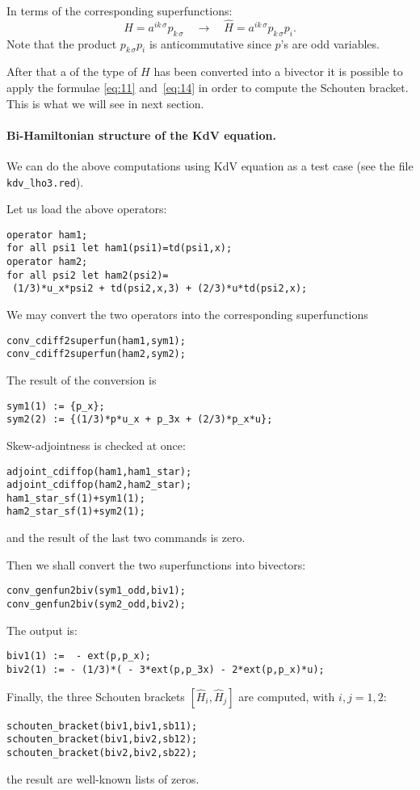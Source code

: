 In terms of the corresponding superfunctions:
\[
  H = a^{ik\,\sigma} p_{k\,\sigma} \quad \to \quad
  \hat H = a^{ik\,\sigma} p_{k\,\sigma}p_i.
\]
Note that the product $p_{k\,\sigma}p_i$ is anticommutative since $p$'s are odd
variables.

After that a \cdiffop of the type of $H$ has been converted into a bivector it
is possible to apply the formulae \eqref{eq:11} and~\eqref{eq:14} in order to
compute the Schouten bracket. This is what we will see in next section.


\paragraph*{Bi-Hamiltonian structure of the KdV equation.}
\label{cdesec:bi-hamilt-struct}
We can do the above computations using KdV equation as a test case (see the
file \texttt{kdv\_lho3.red}).

Let us load the above operators:
\begin{verbatim}
operator ham1;
for all psi1 let ham1(psi1)=td(psi1,x);
operator ham2;
for all psi2 let ham2(psi2)=
 (1/3)*u_x*psi2 + td(psi2,x,3) + (2/3)*u*td(psi2,x);
\end{verbatim}
We may convert the two operators into the corresponding superfunctions
\begin{verbatim}
conv_cdiff2superfun(ham1,sym1);
conv_cdiff2superfun(ham2,sym2);
\end{verbatim}
The result of the conversion is
\begin{verbatim}
sym1(1) := {p_x};
sym2(2) := {(1/3)*p*u_x + p_3x + (2/3)*p_x*u};
\end{verbatim}
Skew-adjointness is checked at once:
\begin{verbatim}
adjoint_cdiffop(ham1,ham1_star);
adjoint_cdiffop(ham2,ham2_star);
ham1_star_sf(1)+sym1(1);
ham2_star_sf(1)+sym2(1);
\end{verbatim}
and the result of the last two commands is zero.

Then we shall convert the two superfunctions into bivectors:
\begin{verbatim}
conv_genfun2biv(sym1_odd,biv1);
conv_genfun2biv(sym2_odd,biv2);
\end{verbatim}
The output is:
\begin{verbatim}
biv1(1) :=  - ext(p,p_x);
biv2(1) := - (1/3)*( - 3*ext(p,p_3x) - 2*ext(p,p_x)*u);
\end{verbatim}
Finally, the three Schouten brackets $[\hat H_i,\hat H_j]$ are computed, with
$i,j=1,2$:
\begin{verbatim}
schouten_bracket(biv1,biv1,sb11);
schouten_bracket(biv1,biv2,sb12);
schouten_bracket(biv2,biv2,sb22);
\end{verbatim}
the result are well-known lists of zeros.


